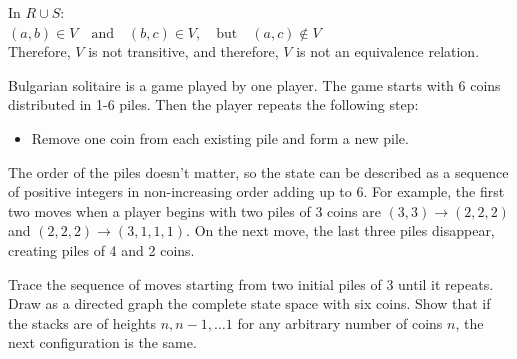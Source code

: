 \documentclass[solution,letterpaper]{cs20}
\begin{document}
\begin{problem}
\begin{solution}
        In \( R \cup S \):\\
        \( (a, b) \in V \quad \text{and} \quad (b, c) \in V, \quad \text{but} \quad (a, c) \notin V \) \\
        Therefore, \( V \) is not transitive, and therefore, \( V \) is not an equivalence relation.
        \end{solution}
    \end{problem}
    \newpage

    \begin{problem}

        Bulgarian solitaire is a game played by one player. The game starts with 6 coins distributed in 1-6 piles. Then the player repeats the following step:

        \begin{itemize}
            \item Remove one coin from each existing pile and form a new pile.
        \end{itemize}

        The order of the piles doesn’t matter, so the state can be described as a sequence of positive integers in non-increasing order adding up to 6. For example, the first two moves when a player begins with two piles of 3 coins are $(3,3) \to (2,2,2)$ and $(2,2,2) \to (3,1,1,1)$. On the next move, the last three piles disappear, creating piles of 4 and 2 coins.

        \subproblem Trace the sequence of moves starting from two initial piles of 3 until it repeats.
        \subproblem Draw as a directed graph the complete state space with six coins.
        \subproblem Show that if the stacks are of heights $n, n-1, \ldots 1$ for any arbitrary number of coins $n$, the next configuration is the same.


\end{problem}
\end{document}
